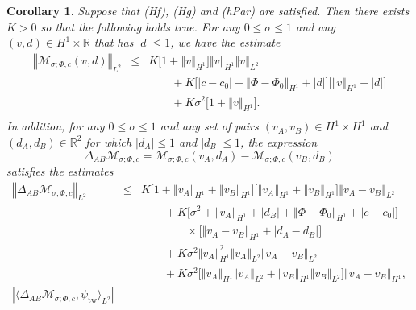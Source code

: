 \documentclass[10pt]{articleHJ}
\newcommand{\Real}{\mathbb{R}}							%
\newcommand{\abs}[1]{\left\vert#1\right\vert}			%
\newcommand{\norm}[1]{\left\Vert#1\right\Vert}		%
\newtheorem{cor}[thm]{Corollary}
\numberwithin{equation}{section}
\begin{document}
\begin{cor}
\label{cor:swv:msigma:bnds}
Suppose that (Hf), (Hg)
and (hPar)
are satisfied.
Then there exists
$K > 0$ so that the following
holds true.
For any
$0 \le \sigma \le 1$
and any
$(v, d) \in H^1 \times \Real$
that has $\abs{d} \le 1$,
we have the estimate
\begin{equation}
\label{eq:swv:msigma:glb:bnd}
\begin{array}{lcl}
 \norm{\mathcal{M}_{\sigma;\Phi, c}(v, d)}_{L^2} & \le &
   K \big[1 + \norm{v}_{H^1} \big]
     \norm{v}_{H^1}  \norm{v}_{L^2}
\\[0.2cm]
& & \qquad
  +  K \big[
   \abs{c - c_0} + \norm{ \Phi- \Phi_0}_{H^1}
   + \abs{d}
  \big] \big[
    \norm{v}_{H^1} + \abs{d}
  \big]
\\[0.2cm]
& & \qquad
  + K \sigma^2
      \big[ 1 + \norm{v}_{H^1} \big] .
\\[0.2cm]
\end{array}
\end{equation}
In addition, for any $0 \le \sigma \le 1$
and any set of pairs
$(v_A, v_B) \in H^1 \times H^1$
and $(d_A, d_B) \in \Real^2$
for which $\abs{d_A} \le 1 $
and $\abs{d_B} \le 1$,
the expression
\begin{equation}
\Delta_{AB} \mathcal{M}_{\sigma;\Phi, c}
 = \mathcal{M}_{\sigma;\Phi, c}(v_A, d_A)
 - \mathcal{M}_{\sigma;\Phi, c}(v_B, d_B)
\end{equation}
satisfies the estimates
\begin{equation}
\label{eq:swv:msigma:lip:bnd}
\begin{array}{lcl}
\norm{\Delta_{AB} \mathcal{M}_{\sigma;\Phi, c} }_{L^2}
  & \le &
  K \big[ 1 + \norm{v_A}_{H^1} + \norm{v_B}_{H^1} \big]
    \big[ \norm{v_A}_{H^1}  + \norm{v_B}_{H^1} \big]
     \norm{v_A-v_B}_{L^2}
\\[0.2cm]
& & \qquad
+ K \big[
  \sigma^2 + \norm{v_A}_{H^1} + \abs{d_B}
   +  \norm{\Phi - \Phi_0}_{H^1}
  + \abs{c - c_0} \big]
\\[0.2cm]
& & \qquad \qquad \times
  \big[
     \norm{v_A-v_B}_{H^1}
      + \abs{d_A - d_B}
  \big]
\\[0.2cm]
& & \qquad
+ K \sigma^2
    \norm{v_A}_{H^1}^2 \norm{v_A}_{L^2}
 \norm{v_A-v_B}_{L^2}
\\[0.2cm]
& & \qquad
  + K \sigma^2
  \Big[ \norm{v_A}_{H^1} \norm{v_A}_{L^2} + \norm{v_B}_{H^1} \norm{v_B}_{L^2} \Big]
    \norm{v_A-v_B}_{H^1} ,
\\[0.2cm]
%
%
\abs{\langle \Delta_{AB} \mathcal{M}_{\sigma;\Phi, c}, \psi_{\mathrm{tw}} \rangle_{L^2} }

\end{array}
\end{equation}
\end{cor}
\end{document}
